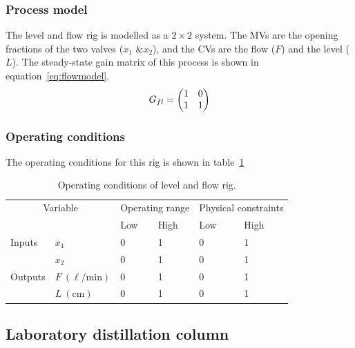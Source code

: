 \subsubsection{Process model}
The level and flow rig is modelled as a $2\times2$ system.
The MVs are the opening fractions of the two valves ($x_1\text{ \& }x_2$), and the CVs are the flow ($F$) and the level ($L$).
The steady-state gain matrix of this process is shown in equation~\ref{eq:flowmodel}.
\begin{equation}
  \label{eq:flowmodel}
    G_{fl} = \begin{pmatrix} 1 & 0 \\
                 1 & 1 \\ \end{pmatrix}
\end{equation}
\subsubsection{Operating conditions}
The operating conditions for this rig is shown in table~\ref{tab:flowopcon}
\begin{table}[htbp]
  \centering
  \begin{tabular}{llllll}
    \toprule
    \multicolumn{2}{c}{Variable} & \multicolumn{2}{c}{Operating range} & \multicolumn{2}{c}{Physical constraints} \\
    && Low & High & Low & High \\ 
    \midrule
    Inputs &$x_1$ & 0 & 1 & 0 & 1 \\
           &$x_2$ & 0 & 1 & 0 & 1 \\[1.3ex]
    Outputs &$F~(\ell\text{/min})$  & 0 & 1 & 0 & 1 \\
            &$L~(\text{cm})$  & 0 & 1 & 0 & 1 \\
    \bottomrule
  \end{tabular}
  \caption{Operating conditions of level and flow rig.}
  \label{tab:flowopcon}
\end{table}

\subsection{Laboratory distillation column}
